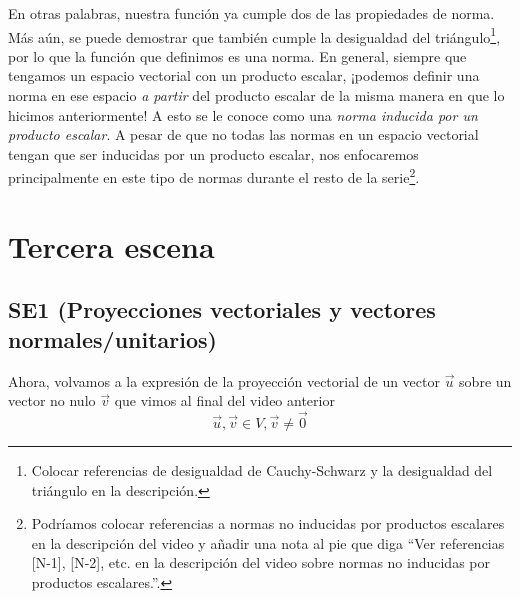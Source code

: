 \documentclass[12pt,dvipsnames]{article}
\numberwithin{equation}{section}
\begin{document}
\noindent En otras palabras, nuestra función ya cumple dos de las propiedades de norma. Más aún, se puede demostrar que también cumple la desigualdad del triángulo\footnote{Colocar referencias de desigualdad de Cauchy-Schwarz y la desigualdad del triángulo en la descripción.}, por lo que la función que definimos es una norma. En general, siempre que tengamos un espacio vectorial con un producto escalar, ¡podemos definir una norma en ese espacio \emph{a partir} del producto escalar de la misma manera en que lo hicimos anteriormente! A esto se le conoce como una \emph{norma inducida por un producto escalar}. A pesar de que no todas las normas en un espacio vectorial tengan que ser inducidas por un producto escalar, nos enfocaremos principalmente en este tipo de normas durante el resto de la serie\footnote{Podríamos colocar referencias a normas no inducidas por productos escalares en la descripción del video y añadir una nota al pie que diga ``Ver referencias [N-1], [N-2], etc. en la descripción del video sobre normas no inducidas por productos escalares.''.}.


\newpage
\section{Tercera escena}

\subsection{SE1 (Proyecciones vectoriales y vectores normales/unitarios)}

Ahora, volvamos a la expresión de la proyección vectorial de un vector $\vec{u}$ sobre un vector no nulo $\vec{v}$ que vimos al final del video anterior
\[
\vec{u},\vec{v}\in V, \vec{v}\neq \vec{0}
\] 
\end{document}
